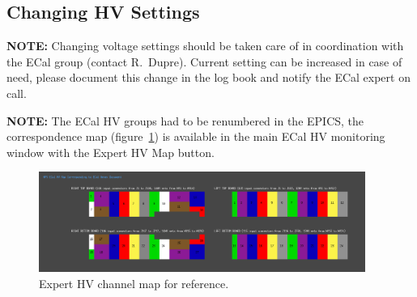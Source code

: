 \documentclass[12pt]{article}
\begin{document}
{%
   \subsection{Changing HV Settings}
      {\bf NOTE:} Changing voltage settings should be taken care of in coordination with the ECal group (contact R.~Dupre). Current setting can be increased in case of need, please document this change in the log book and notify the ECal expert on call.

 {\bf NOTE:} The ECal HV groups had to be renumbered in the EPICS, the correspondence map (figure~\ref{ExpertMap}) is available in the main ECal HV monitoring window with the Expert HV Map button.

\begin{figure}[htbp]
\center
\includegraphics[width=0.95\textwidth]{pics/ecalhv_expertmap_2014_12_15.png}
\caption{\small \label{ExpertMap} Expert HV channel map for reference.}
\end{figure}

}
\end{document}
